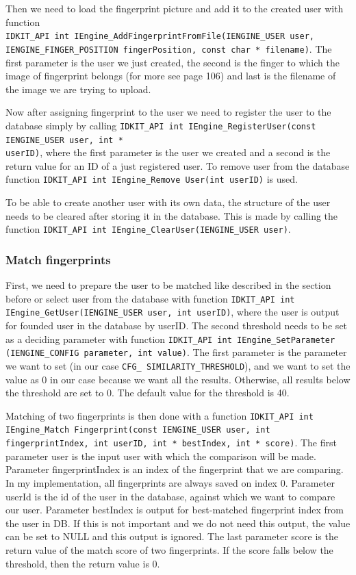 Then we need to load the fingerprint picture and add it to the created user with function \\
\texttt{IDKIT\_API int IEngine\_AddFingerprintFromFile(IENGINE\_USER user,\\ IENGINE\_FINGER\_POSITION fingerPosition, const char * filename)}. The first parameter is the user we just created, the second is the finger to which the image of fingerprint belongs (for more see \cite{idkitsdk} page 106) and last is the filename of the image we are trying to upload.

Now after assigning fingerprint to the user we need to register the user to the database simply by calling \texttt{IDKIT\_API int IEngine\_RegisterUser(const IENGINE\_USER user, int *\\ userID)}, where the first parameter is the user we created and a second is the return value for an ID of a just registered user. To remove user from the database function \texttt{IDKIT\_API int IEngine\_Remove User(int userID)} is used.

To be able to create another user with its own data, the structure of the user needs to be cleared after storing it in the database. This is made by calling the function \texttt{IDKIT\_API int IEngine\_ClearUser(IENGINE\_USER user)}.

\subsubsection{Match fingerprints}
First, we need to prepare the user to be matched like described in the section before or select user from the database with function \texttt{IDKIT\_API int IEngine\_GetUser(IENGINE\_USER user, int userID)}, where the user is output for founded user in the database by userID. The second threshold needs to be set as a deciding parameter with function \texttt{IDKIT\_API int IEngine\_SetParame\-ter (IENGINE\_CONFIG parameter, int value)}. The first parameter is the parameter we want to set (in our case \texttt{CFG\_ SIMILARITY\_THRESHOLD}), and we want to set the value as 0 in our case because we want all the results. Otherwise, all results below the threshold are set to 0. The default value for the threshold is 40.

Matching of two fingerprints is then done with a function \texttt{IDKIT\_API int IEngine\_Match Fingerprint(const IENGINE\_USER user, int fingerprintIndex, int userID, int * bestIndex, int * score)}. The first parameter user is the input user with which the comparison will be made. Parameter fingerprintIndex is an index of the fingerprint that we are comparing. In my implementation, all fingerprints are always saved on index 0. Parameter userId is the id of the user in the database, against which we want to compare our user. Parameter bestIndex is output for best-matched fingerprint index from the user in DB. If this is not important and we do not need this output, the value can be set to NULL and this output is ignored. The last parameter score is the return value of the match score of two fingerprints. If the score falls below the threshold, then the return value is 0.  
  

